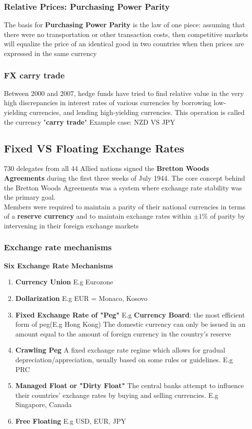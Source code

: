 \documentclass{article}
\theoremstyle{definition}
\theoremstyle{thrm}
\theoremstyle{lma}
\theoremstyle{ppst}
\theoremstyle{crlr}
\begin{document}
\subsubsection{Relative Prices: Purchasing Power Parity}
The basis for \textbf{Purchasing Power Parity} is the law of one piece: assuming that there were no transportation or other transaction costs, then competitive markets will equalize the price of an identical good in two countries when then prices are expressed in the same currency

\subsubsection{FX carry trade}
Between 2000 and 2007, hedge funds have tried to find relative value in the very high discrepancies in interest rates of various currencies by borrowing low-yielding currencies, and lending high-yielding currencies. This operation is called the currency "\textbf{carry trade}"
Example case: NZD VS JPY

\subsection{Fixed VS Floating Exchange Rates}
730 delegates from all 44 Allied nations signed the \textbf{Bretton Woods Agreements} during the first three weeks of July 1944. The core concept behind the Bretton Woods Agreements was a system where exchange rate stability was the primary goal.\\
Members were required to maintain a parity of their national currencies in terms of a \textbf{reserve currency} and to maintain exchange rates within $\pm 1\%$ of parity by intervening in their foreign exchange markets
\subsubsection{Exchange rate mechanisms}
\textbf{Six Exchange Rate Mechanisms}
\begin{enumerate}
	\item \textbf{Currency Union} E.g Eurozone
	\item \textbf{Dollarization} E.g EUR = Monaco, Kosovo
	\item \textbf{Fixed Exchange Rate of "Peg"} E.g \textbf{Currency Board}: the most efficient form of peg(E.g Hong Kong) The domestic currency can only be issued in an amount equal to the amount of foreign currency in the country's reserve
	\item \textbf{Crawling Peg} A fixed exchange rate regime which allows for gradual depreciation/appreciation, usually based on some rules or guidelines. E.g PRC
	\item \textbf{Managed Float or "Dirty Float"} The central banks attempt to influence their countries' exchange rates by buying and selling currencies. E.g Singapore, Canada
	\item \textbf{Free Floating} E.g USD, EUR, JPY
\end{enumerate}
\end{document}
